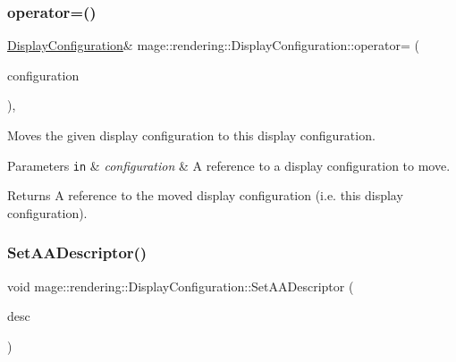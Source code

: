\subsubsection{\texorpdfstring{operator=()}{operator=()}\hspace{0.1cm}{\footnotesize\ttfamily [2/2]}}
{\footnotesize\ttfamily \hyperlink{classmage_1_1rendering_1_1_display_configuration}{Display\+Configuration}\& mage\+::rendering\+::\+Display\+Configuration\+::operator= (\begin{DoxyParamCaption}\item[{\hyperlink{classmage_1_1rendering_1_1_display_configuration}{Display\+Configuration} \&\&}]{configuration }\end{DoxyParamCaption})\hspace{0.3cm}{\ttfamily [default]}, {\ttfamily [noexcept]}}

Moves the given display configuration to this display configuration.


\begin{DoxyParams}[1]{Parameters}
\mbox{\tt in}  & {\em configuration} & A reference to a display configuration to move. \\
\hline
\end{DoxyParams}
\begin{DoxyReturn}{Returns}
A reference to the moved display configuration (i.\+e. this display configuration). 
\end{DoxyReturn}
\hypertarget{classmage_1_1rendering_1_1_display_configuration_ae41a16a437d9a8e3cdf12024affbc1f6}{}\label{classmage_1_1rendering_1_1_display_configuration_ae41a16a437d9a8e3cdf12024affbc1f6} 
\subsubsection{\texorpdfstring{Set\+A\+A\+Descriptor()}{SetAADescriptor()}}
{\footnotesize\ttfamily void mage\+::rendering\+::\+Display\+Configuration\+::\+Set\+A\+A\+Descriptor (\begin{DoxyParamCaption}\item[{\hyperlink{namespacemage_1_1rendering_a25c189fd1da946d7a8f0abdd4f0e6afa}{A\+A\+Descriptor}}]{desc }\end{DoxyParamCaption})\hspace{0.3cm}{\ttfamily [noexcept]}}

